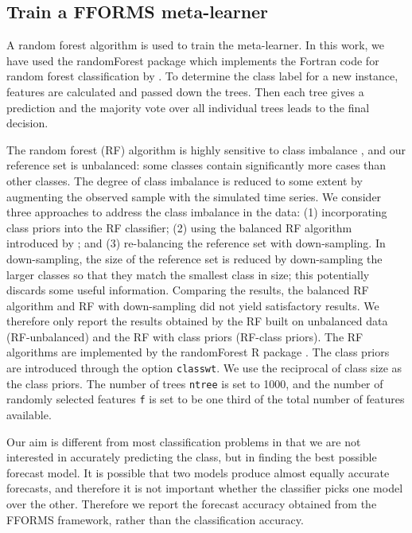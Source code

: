 \documentclass[11pt,a4paper,]{article}
\begin{document}
\hypertarget{train-a-fforms-meta-learner}{%
\subsection{Train a FFORMS meta-learner}\label{train-a-fforms-meta-learner}}

A random forest algorithm is used to train the meta-learner. In this work, we have used the randomForest package \autocites{liaw2002randomforest}{rfpkg} which implements the Fortran code for random forest classification by \textcite{breiman2004random}.
To determine the class label for a new instance, features are calculated and passed down the trees. Then each tree gives a prediction and the majority vote over all individual trees leads to the final decision.

The random forest (RF) algorithm is highly sensitive to class imbalance \autocite{breiman2001random}, and our reference set is unbalanced: some classes contain significantly more cases than other classes. The degree of class imbalance is reduced to some extent by augmenting the observed sample with the simulated time series. We consider three approaches to address the class imbalance in the data: (1) incorporating class priors into the RF classifier; (2) using the balanced RF algorithm introduced by \textcite{chen2004using}; and (3) re-balancing the reference set with down-sampling. In down-sampling, the size of the reference set is reduced by down-sampling the larger classes so that they match the smallest class in size; this potentially discards some useful information. Comparing the results, the balanced RF algorithm and RF with down-sampling did not yield satisfactory results. We therefore only report the results obtained by the RF built on unbalanced data (RF-unbalanced) and the RF with class priors (RF-class priors). The RF algorithms are implemented by the randomForest R package \autocites{liaw2002randomforest}{rfpkg}. The class priors are introduced through the option \texttt{classwt}. We use the reciprocal of class size as the class priors. The number of trees \texttt{ntree} is set to 1000, and the number of randomly selected features \texttt{f} is set to be one third of the total number of features available.

Our aim is different from most classification problems in that we are not interested in accurately predicting the class, but in finding the best possible forecast model. It is possible that two models produce almost equally accurate forecasts, and therefore it is not important whether the classifier picks one model over the other. Therefore we report the forecast accuracy obtained from the FFORMS framework, rather than the classification accuracy.
\end{document}
